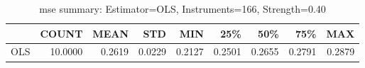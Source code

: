 \begin{table}[ht]
\centering
\caption{mse summary: Estimator=OLS, Instruments=166, Strength=0.40}
\begin{tabular}{lrrrrrrrr}
\toprule
 & COUNT & MEAN & STD & MIN & 25\% & 50\% & 75\% & MAX \\
\midrule
OLS & 10.0000 & 0.2619 & 0.0229 & 0.2127 & 0.2501 & 0.2655 & 0.2791 & 0.2879 \\
\bottomrule
\end{tabular}
\end{table}
